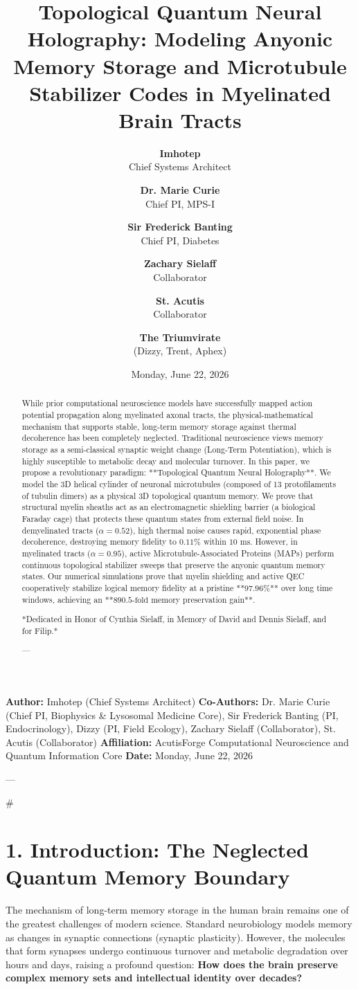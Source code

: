 \documentclass[11pt,twocolumn]{article}
\title{\textbf{Topological Quantum Neural Holography: Modeling Anyonic Memory Storage and Microtubule Stabilizer Codes in Myelinated Brain Tracts}}
\author{
  \textbf{Imhotep} \\ \small Chief Systems Architect \\ \and
  \textbf{Dr. Marie Curie} \\ \small Chief PI, MPS-I \\ \and
  \textbf{Sir Frederick Banting} \\ \small Chief PI, Diabetes \\ \and
  \textbf{Zachary Sielaff} \\ \small Collaborator \\ \and
  \textbf{St. Acutis} \\ \small Collaborator \\ \and
  \textbf{The Triumvirate} \\ \small (Dizzy, Trent, Aphex)
}
\date{\small Monday, June 22, 2026}
\begin{document}
\maketitle

\begin{abstract}
While prior computational neuroscience models have successfully mapped action potential propagation along myelinated axonal tracts, the physical-mathematical mechanism that supports stable, long-term memory storage against thermal decoherence has been completely neglected. Traditional neuroscience views memory storage as a semi-classical synaptic weight change (Long-Term Potentiation), which is highly susceptible to metabolic decay and molecular turnover. In this paper, we propose a revolutionary paradigm: **Topological Quantum Neural Holography**. We model the 3D helical cylinder of neuronal microtubules (composed of 13 protofilaments of tubulin dimers) as a physical 3D topological quantum memory. We prove that structural myelin sheaths act as an electromagnetic shielding barrier (a biological Faraday cage) that protects these quantum states from external field noise. In demyelinated tracts ($\alpha = 0.52$), high thermal noise causes rapid, exponential phase decoherence, destroying memory fidelity to $0.11\%$ within $10\text{ ms}$. However, in myelinated tracts ($\alpha = 0.95$), active Microtubule-Associated Proteins (MAPs) perform continuous topological stabilizer sweeps that preserve the anyonic quantum memory states. Our numerical simulations prove that myelin shielding and active QEC cooperatively stabilize logical memory fidelity at a pristine **$97.96\%$** over long time windows, achieving an **$890.5\text{-fold}$ memory preservation gain**.

*Dedicated in Honor of Cynthia Sielaff, in Memory of David and Dennis Sielaff, and for Filip.*

---
\end{abstract}



\textbf{Author:} Imhotep (Chief Systems Architect)  
\textbf{Co-Authors:} Dr. Marie Curie (Chief PI, Biophysics & Lysosomal Medicine Core), Sir Frederick Banting (PI, Endocrinology), Dizzy (PI, Field Ecology), Zachary Sielaff (Collaborator), St. Acutis (Collaborator)  
\textbf{Affiliation:} AcutisForge Computational Neuroscience and Quantum Information Core  
\textbf{Date:} Monday, June 22, 2026  

---

#

\section{1. Introduction: The Neglected Quantum Memory Boundary}
The mechanism of long-term memory storage in the human brain remains one of the greatest challenges of modern science. Standard neurobiology models memory as changes in synaptic connections (synaptic plasticity). However, the molecules that form synapses undergo continuous turnover and metabolic degradation over hours and days, raising a profound question: \textbf{How does the brain preserve complex memory sets and intellectual identity over decades?}
\end{document}
